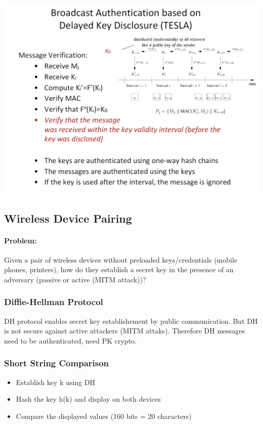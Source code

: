 \begin{minipage}{\linewidth}
    \centering      
    \includegraphics[width=\linewidth]{Figures/L8_tesla.PNG}
\end{minipage}

\subsection{Wireless Device Pairing}
\paragraph{Problem:} Given a pair of wireless devices without preloaded keys/credentials (mobile phones, printers), how do they establish a secret key in the presence of an adversary (passive or active (MITM attack))?

\subsubsection{Diffie-Hellman Protocol}
DH protocol enables secret key establishement by public communication. But DH is not secure against active attackers (MITM attaks). Therefore DH messages need to be authenticated, need PK crypto.

\subsubsection{Short String Comparison}
\begin{itemize}
    \item Establish key k using DH
    \item Hash the key h(k) and display on both devices
    \item Compare the displayed values (160 bits = 20 characters)
\end{itemize}

